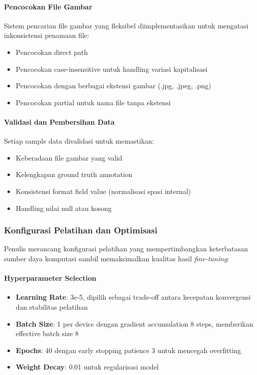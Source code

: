 \paragraph{Pencocokan File Gambar}
Sistem pencarian file gambar yang fleksibel diimplementasikan untuk mengatasi inkonsistensi penamaan file:
\begin{itemize}
    \item Pencocokan direct path
    \item Pencocokan case-insensitive untuk handling variasi kapitalisasi
    \item Pencocokan dengan berbagai ekstensi gambar (.jpg, .jpeg, .png)
    \item Pencocokan partial untuk nama file tanpa ekstensi
\end{itemize}

\paragraph{Validasi dan Pembersihan Data}
Setiap sample data divalidasi untuk memastikan:
\begin{itemize}
    \item Keberadaan file gambar yang valid
    \item Kelengkapan ground truth annotation
    \item Konsistensi format field value (normalisasi spasi internal)
    \item Handling nilai null atau kosong
\end{itemize}

\subsubsection{Konfigurasi Pelatihan dan Optimisasi}
\label{subsubsec:konfigurasi-pelatihan}

Penulis merancang konfigurasi pelatihan yang mempertimbangkan keterbatasan sumber daya komputasi sambil memaksimalkan kualitas hasil \emph{fine-tuning}:

\paragraph{Hyperparameter Selection}
\begin{itemize}
    \item \textbf{Learning Rate}: 3e-5, dipilih sebagai trade-off antara kecepatan konvergensi dan stabilitas pelatihan
    \item \textbf{Batch Size}: 1 per device dengan gradient accumulation 8 steps, memberikan effective batch size 8
    \item \textbf{Epochs}: 40 dengan early stopping patience 3 untuk mencegah overfitting
    \item \textbf{Weight Decay}: 0.01 untuk regularisasi model
\end{itemize}

